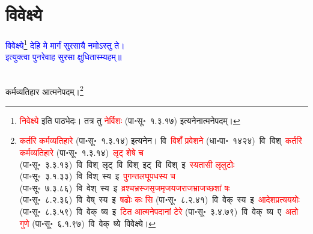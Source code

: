 \section[विवेक्ष्ये]{विवेक्ष्ये}
\centering\textcolor{blue}{विवेक्ष्ये\footnote{\textcolor{red}{निवेक्ष्ये} इति पाठभेदः। तत्र तु \textcolor{red}{नेर्विशः} (पा॰सू॰~१.३.१७) इत्यनेनात्मनेपदम्।} देहि मे मार्गं सुरसायै नमोऽस्तु ते।\nopagebreak\\
इत्युक्त्वा पुनरेवाह सुरसा क्षुधितास्म्यहम्॥}\nopagebreak\\
\\
\fontsize{14}{21}\selectfont\begin{sloppypar}\justifying\noindent\hspace{10mm} कर्म\-व्यतिहार आत्मनेपदम्।\footnote{\textcolor{red}{कर्तरि कर्मव्यतिहारे} (पा॰सू॰~१.३.१४) इत्यनेन। वि~\textcolor{red}{विशँ प्रवेशने} (धा॰पा॰~१४२४)~\arrow वि~विश्~\arrow \textcolor{red}{कर्तरि कर्म\-व्यतिहारे} (पा॰सू॰~१.३.१४)~\arrow \textcolor{red}{लृट् शेषे च} (पा॰सू॰~३.३.१३)~\arrow वि~विश्~लृट्~\arrow वि~विश्~इट्~\arrow वि~विश्~इ~\arrow \textcolor{red}{स्यतासी लृलुटोः} (पा॰सू॰~३.१.३३)~\arrow वि~विश्~स्य~इ~\arrow \textcolor{red}{पुगन्त\-लघूपधस्य च} (पा॰सू॰~७.३.८६)~\arrow वि~वेश्~स्य~इ~\arrow \textcolor{red}{व्रश्चभ्रस्ज\-सृजमृज\-यजराज\-भ्राजच्छशां षः} (पा॰सू॰~८.२.३६)~\arrow वि~वेष्~स्य~इ~\arrow \textcolor{red}{षढोः कः सि} (पा॰सू॰~८.२.४१)~\arrow वि~वेक्~स्य~इ~\arrow \textcolor{red}{आदेश\-प्रत्यययोः} (पा॰सू॰~८.३.५९)~\arrow वि~वेक्~ष्य~इ~\arrow \textcolor{red}{टित आत्मनेपदानां टेरे} (पा॰सू॰~३.४.७९)~\arrow वि~वेक्~ष्य~ए~\arrow \textcolor{red}{अतो गुणे} (पा॰सू॰~६.१.९७)~\arrow वि~वेक्~ष्ये~\arrow विवेक्ष्ये।}\end{sloppypar}
